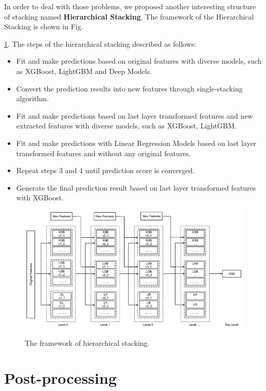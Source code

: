 \documentclass[12pt]{article}
\begin{document}
In order to deal with those problems, we proposed another interesting structure of stacking named \textbf{Hierarchical Stacking}. The framework of the Hierarchical Stacking  is shown in Fig.~{\ref{fig:hierarchical-stacking}. The steps of the hierarchical stacking described as follows:

\begin{itemize}
\label{alg:cascade-stacking}
\item[1.] Fit and make predictions based on original features with diverse models, such as XGBoost, LightGBM and Deep Models.
\item[2.] Convert the prediction results into new features through single-stacking algorithm.
\item[3.] Fit and make predictions based on last layer transformed features and new extracted features with diverse models, such as XGBoost, LightGBM.
\item[4.] Fit and make predictions with Linear Regression Models based on last layer transformed features and without any original features.
\item[5.] Repeat steps 3 and 4 until prediction score is converged.
\item[6.] Generate the final prediction result based on last layer transformed features with XGBoost.
\end{itemize}


\begin{figure}[ht]
  \centering
  \includegraphics[width=1.0\textwidth]{../img/hierarchical-stacking}\\
  \caption{The framework of hierarchical stacking.}
  \label{fig:hierarchical-stacking}
\end{figure}

\section{Post-processing}

}
\end{document}
